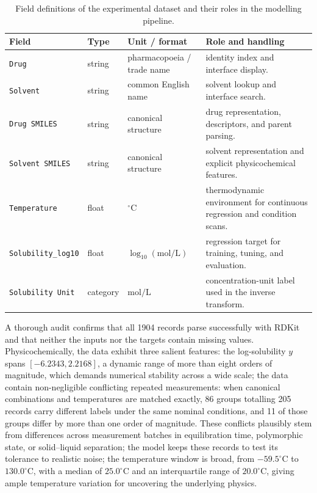 \begin{table}[htbp]
  \centering\small
  \caption{Field definitions of the experimental dataset and their roles in the modelling pipeline.}
  \label{tab:v2-data-fields}
  \begin{tabularx}{\linewidth}{@{}lllX@{}}
    \toprule
    Field & Type & Unit / format & Role and handling \\
    \midrule
    \texttt{Drug} & string & pharmacopoeia / trade name & identity index and interface display. \\
    \texttt{Solvent} & string & common English name & solvent lookup and interface search. \\
    \texttt{Drug SMILES} & string & canonical structure & drug representation, descriptors, and parent parsing. \\
    \texttt{Solvent SMILES} & string & canonical structure & solvent representation and explicit physicochemical features. \\
    \texttt{Temperature} & float & $^\circ\text{C}$ & thermodynamic environment for continuous regression and condition scans. \\
    \texttt{Solubility\_log10} & float & $\log_{10}(\mathrm{mol/L})$ & regression target for training, tuning, and evaluation. \\
    \texttt{Solubility Unit} & category & $\mathrm{mol/L}$ & concentration-unit label used in the inverse transform. \\
    \bottomrule
  \end{tabularx}
\end{table}

A thorough audit confirms that all 1904 records parse successfully with RDKit and that neither the inputs nor the targets contain missing values. Physicochemically, the data exhibit three salient features:
the log-solubility $y$ spans $[-6.2343, 2.2168]$, a dynamic range of more than eight orders of magnitude, which demands numerical stability across a wide scale;
the data contain non-negligible conflicting repeated measurements: when canonical combinations and temperatures are matched exactly, 86 groups totalling 205 records carry different labels under the same nominal conditions, and 11 of those groups differ by more than one order of magnitude. These conflicts plausibly stem from differences across measurement batches in equilibration time, polymorphic state, or solid--liquid separation; the model keeps these records to test its tolerance to realistic noise;
the temperature window is broad, from $-59.5^\circ\text{C}$ to $130.0^\circ\text{C}$, with a median of $25.0^\circ\text{C}$ and an interquartile range of $20.0^\circ\text{C}$, giving ample temperature variation for uncovering the underlying physics.

